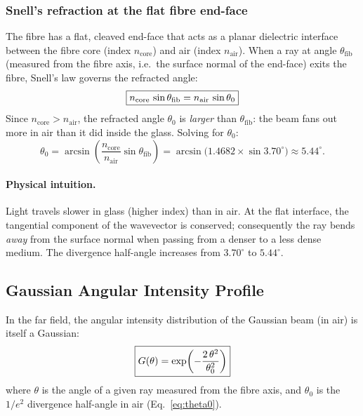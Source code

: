\subsubsection{Snell's refraction at the flat fibre end-face}
\label{sec:snell}

The fibre has a flat, cleaved end-face that acts as a planar dielectric
interface between the fibre core (index $n_\text{core}$) and air
(index $n_\text{air}$).  When a ray at angle $\theta_\text{fib}$
(measured from the fibre axis, i.e.\ the surface normal of the end-face)
exits the fibre, Snell's law governs the refracted angle:
%
\begin{equation}\label{eq:snell}
  \boxed{%
    n_\text{core}\,\sin\theta_\text{fib}
    = n_\text{air}\,\sin\theta_0
  }
\end{equation}
%
Since $n_\text{core} > n_\text{air}$, the refracted angle $\theta_0$
is \emph{larger} than $\theta_\text{fib}$: the beam fans out more
in air than it did inside the glass.  Solving for $\theta_0$:
%
\begin{equation}\label{eq:theta0}
  \theta_0
  = \arcsin\!\left(\frac{n_\text{core}}{n_\text{air}}
    \sin\theta_\text{fib}\right)
  = \arcsin\!\bigl(1.4682 \times \sin 3.70^\circ\bigr)
  \approx 5.44^\circ.
\end{equation}

\paragraph{Physical intuition.}
Light travels slower in glass (higher index) than in air.  At the flat
interface, the tangential component of the wavevector is conserved;
consequently the ray bends \emph{away} from the surface normal when
passing from a denser to a less dense medium.  The divergence
half-angle increases from $3.70^\circ$ to $5.44^\circ$.

\subsection{Gaussian Angular Intensity Profile}

In the far field, the angular intensity distribution of the Gaussian
beam (in air) is itself a Gaussian:
%
\begin{equation}\label{eq:gaussian}
  \boxed{%
    G(\theta) = \exp\!\left(-\frac{2\,\theta^2}{\theta_0^2}\right)
  }
\end{equation}
%
where $\theta$ is the angle of a given ray measured from the fibre axis,
and $\theta_0$ is the $1/e^2$ divergence half-angle in air
(Eq.~\ref{eq:theta0}).

